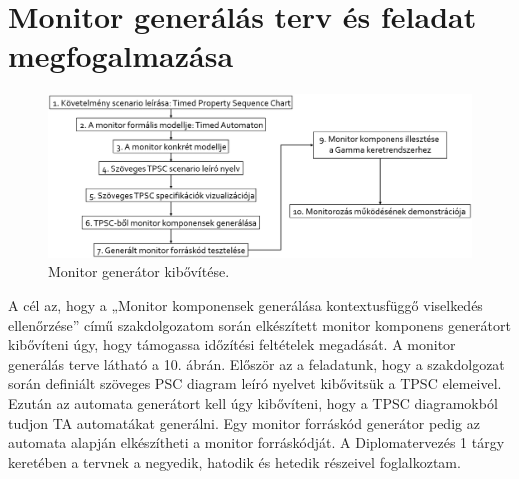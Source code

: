 \chapter{Monitor generálás terv és feladat megfogalmazása}

\begin{figure}[!ht]
    \centering
    \includegraphics[width=150mm, keepaspectratio]{figures/generation_plan.png}
    \caption{Monitor generátor kibővítése.}
\end{figure}

A cél az, hogy a „Monitor komponensek generálása kontextusfüggő viselkedés ellenőrzése” című szakdolgozatom során elkészített monitor komponens generátort kibővíteni úgy, hogy támogassa időzítési feltételek megadását. A monitor generálás terve látható a 10. ábrán. Először az a feladatunk, hogy a szakdolgozat során definiált szöveges PSC diagram leíró nyelvet kibővitsük a TPSC elemeivel. Ezután az automata generátort kell úgy kibővíteni, hogy a TPSC diagramokból tudjon TA automatákat generálni. Egy monitor forráskód generátor pedig az automata alapján elkészítheti a monitor forráskódját. A Diplomatervezés 1 tárgy keretében a tervnek a negyedik, hatodik és hetedik részeivel foglalkoztam.